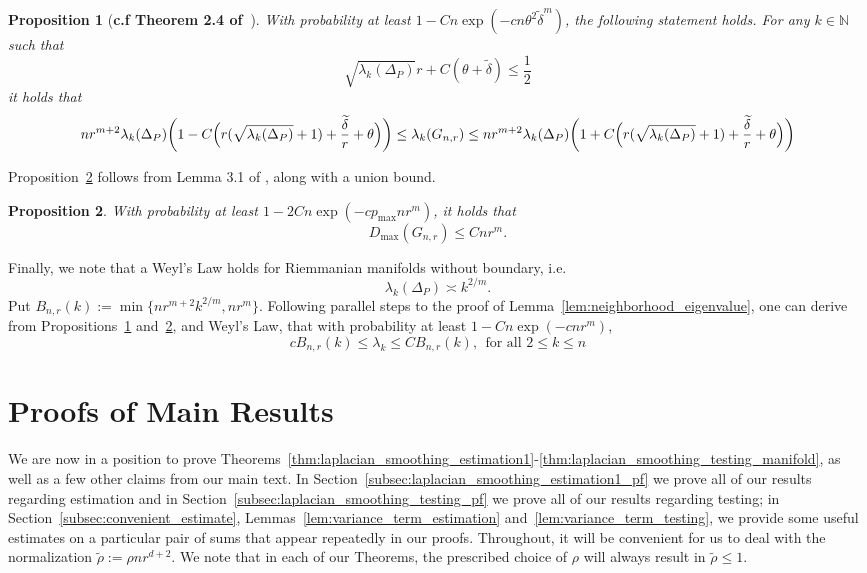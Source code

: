 \documentclass[twoside]{article}
\newcommand{\1}{\mathbf{1}}
\newcommand{\wt}[1]{\widetilde{#1}}
\newtheorem{proposition}{Proposition}
\theoremstyle{definition}
\theoremstyle{remark}
\begin{document}
\begin{proposition}[\textbf{c.f Theorem 2.4 of~\citet{calder2019}}]
	\label{prop:calder19_1}
	With probability at least $1 - Cn\exp(-cn\theta^2\wt{\delta}^m)$, the following statement holds. For any $k \in \mathbb{N}$ such that
	\begin{equation*}
	\sqrt{\lambda_k(\Delta_P)}r + C(\theta + \wt{\delta}) \leq \frac{1}{2}
	\end{equation*} 
	it holds that
	\begin{equation*}
	nr^{m+2} \lambda_k(\Delta_P) \biggl(1 - C\Bigl(r(\sqrt{\lambda_k(\Delta_P)} + 1) + \frac{\wt{\delta}}{r} + \theta\Bigr)\biggr)\leq \lambda_k(G_{n,r}) \leq nr^{m+2} \lambda_k(\Delta_P) \biggl(1 + C\Bigl(r(\sqrt{\lambda_k(\Delta_P)} + 1) + \frac{\wt{\delta}}{r} + \theta\Bigr)\biggr)
	\end{equation*}
\end{proposition}

Proposition~\ref{prop:calder19_2} follows from Lemma 3.1 of \citet{calder2019}, along with a union bound.
\begin{proposition}
	\label{prop:calder19_2}
	With probability at least $1 - 2Cn\exp(-cp_{\max}nr^m)$, it holds that
	\begin{equation*}
	D_{\max}(G_{n,r}) \leq Cnr^{m}.
	\end{equation*}
\end{proposition}

Finally, we note that a Weyl's Law holds for Riemmanian manifolds without boundary, i.e.
\begin{equation*}
\lambda_k(\Delta_P) \asymp k^{2/m}.
\end{equation*}
Put $B_{n,r}(k) := \min\{nr^{m + 2}k^{2/m}, nr^m\}$. Following parallel steps to the proof of Lemma~\ref{lem:neighborhood_eigenvalue}, one can derive from Propositions~\ref{prop:calder19_1} and~\ref{prop:calder19_2}, and Weyl's Law, that with probability at least $1 - Cn\exp(-cnr^m)$, 
\begin{equation}
\label{eqn:neighborhood_eigenvalue_manifold}
cB_{n,r}(k) \leq \lambda_k \leq CB_{n,r}(k),~~\textrm{for all $2 \leq k \leq n$}
\end{equation}

\section{Proofs of Main Results}
\label{sec:main_results}
We are now in a position to prove Theorems~\ref{thm:laplacian_smoothing_estimation1}-\ref{thm:laplacian_smoothing_testing_manifold}, as well as a few other claims from our main text. In Section~\ref{subsec:laplacian_smoothing_estimation1_pf} we prove all of our results regarding estimation and in Section~\ref{subsec:laplacian_smoothing_testing_pf} we prove all of our results regarding testing; in Section~\ref{subsec:convenient_estimate}, Lemmas~\ref{lem:variance_term_estimation} and~\ref{lem:variance_term_testing}, we provide some useful estimates on a particular pair of sums that appear repeatedly in our proofs. Throughout, it will be convenient for us to deal with the normalization $\wt{\rho} := \rho nr^{d + 2}$. We note that in each of our Theorems, the prescribed choice of $\rho$ will always result in $\wt{\rho} \leq 1$. 
\end{document}
